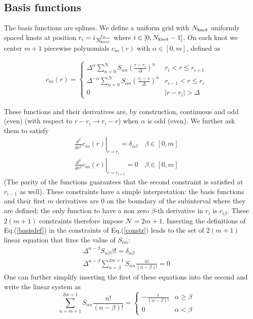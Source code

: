 \subsection{Basis functions}
The basis functions are splines. We define a uniform grid 
with $N_\text{knot}$ uniformly spaced knots at position $r_i=i\frac{r_c}{N_\text{knot}}$ 
where $i\in[0,N_\text{knot}-1]$. On each knot we center $m+1$ piecewise polynomials
$c_{i\alpha}(r)$ with $\alpha\in[0,m]$, defined as
\vskip 3mm
\begin{center}
\begin{eqnarray}
c_{i\alpha}(r)=\begin{cases}
\Delta^\alpha \sum_{n=0}^\mathcal{N} S_{\alpha n}(\frac{r-r_i}{\Delta})^n & r_i<r\le r_{i+1} \\
\Delta^{-\alpha} \sum_{n=0}^\mathcal{N} S_{\alpha n}(\frac{r_i-r}{\Delta})^n & r_{i-1}<r\le r_i \\
0 & |r-r_i| > \Delta
\end{cases}
\label{basisdef}
\end{eqnarray}

\end{center}
\vskip 3mm
These functions and their derivatives are, by construction, continuous and odd (even)
(with respect to $r-r_i\rightarrow r_i-r$) when $\alpha$ is odd (even).
We further ask them to satisfy
\begin{eqnarray}
\left.\frac{d^\beta}{dr^\beta} c_{i\alpha}(r)\right|_{r=r_i}=
\delta_{\alpha\beta} \quad \beta\in[0,m]\\
\left.\frac{d^{\beta}}{dr^{\beta}} c_{i\alpha}(r)\right|_{r=r_{i+1}}=0\quad \beta\in[0,m]
\label{constr}
\end{eqnarray}
(The parity of the functions guarantees that the second constraint is satisfied
at $r_{i-1}$ as well). These constraints have a simple interpretation: the basis functions
and their first $m$ derivatives are $0$ on the boundary of the subinterval where they
are defined; the only function to have a non zero $\beta$-th derivative in $r_i$ is $c_{i\beta}$.
These $2(m+1)$ constraints therefore impose $\mathcal{N}=2m+1$. 
Inserting the definitions of Eq.(\ref{basisdef}) in the constraints of Eq.(\ref{constr})
leads to the set of $2(m+1)$ linear equation that fixes the value of $S_{\alpha n}$: 
\begin{eqnarray}
\Delta^{\alpha-\beta} S_{\alpha\beta} \beta!=\delta_{\alpha\beta}
\label{Smatrix1}\\
\Delta^{\alpha-\beta}\sum_{n=\beta}^{2m+1} S_{\alpha n} \frac{n!}{(n-\beta)!}=0
\end{eqnarray}
One can further simplify inserting the first of these equations into the second and write
the linear system as
\begin{equation}
\sum_{n=m+1}^{2m+1} S_{\alpha n} \frac{n!}{(n-\beta)!}=\begin{cases}
-\frac{1}{(\alpha-\beta)!}& \alpha\ge \beta \\
0 & \alpha < \beta
\end{cases}
\label{Smatrix2}
\end{equation}

